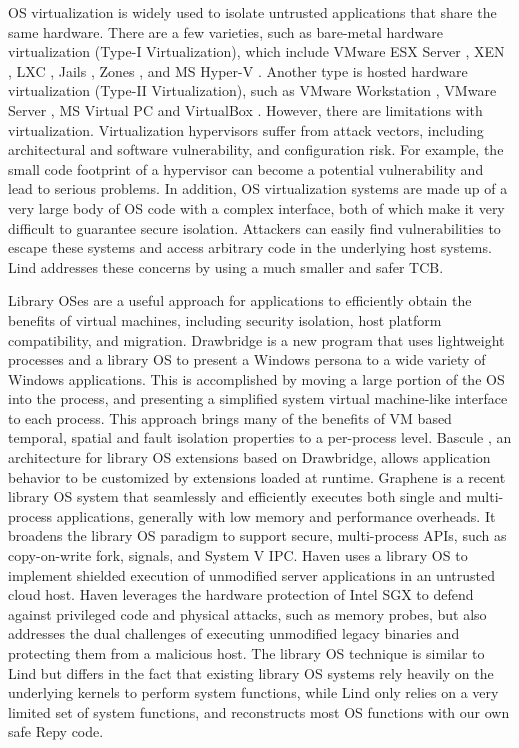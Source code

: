 OS virtualization is widely used to isolate untrusted applications that share the same hardware. 
There are a few varieties, such as bare-metal hardware virtualization (Type-I Virtualization), 
which include VMware ESX Server \cite{VMWare-ESX-Server}, XEN \cite{Xen-03}, LXC \cite{LXC}, 
Jails \cite{Jails}, Zones \cite{Zones}, and MS Hyper-V \cite{Microsoft-Hyper-V}. 
Another type is hosted hardware virtualization (Type-II Virtualization), such as VMware Workstation \cite{VMWare-Workstation}, 
VMware Server \cite{VMWare-Server}, MS Virtual PC \cite{Microsoft-Virtual-PC} and VirtualBox \cite{VirtualBox}. 
However, there are limitations with virtualization. 
Virtualization hypervisors suffer from attack vectors, including architectural and software vulnerability, 
and configuration risk. For example, the small code footprint of a hypervisor can become a potential vulnerability 
and lead to serious problems. In addition, OS virtualization systems are made up of a very large body of 
OS code with a complex interface, both of which make it very difficult to guarantee secure isolation. 
Attackers can easily find vulnerabilities to escape these systems and access arbitrary code 
in the underlying host systems. Lind addresses these concerns by using a much smaller and safer TCB.

Library OSes are a useful approach for applications to efficiently obtain the benefits of virtual machines, 
including security isolation, host platform compatibility, and migration. Drawbridge \cite{Drawbridge-11} is a new program 
that uses lightweight processes and a library OS to present a Windows persona to a wide variety of Windows applications. 
This is accomplished by moving a large portion of the OS into the process, and presenting a simplified system 
virtual machine-like interface to each process. This approach brings many of the benefits of VM based temporal, 
spatial and fault isolation properties to a per-process level. Bascule \cite{Bascule}, an architecture for library OS extensions 
based on Drawbridge, allows application behavior to be customized by extensions loaded at runtime. 
Graphene \cite{Graphene-14} is a recent library OS system that seamlessly and efficiently executes both single and 
multi-process applications, generally with low memory and performance overheads. 
It broadens the library OS paradigm to support secure, multi-process APIs, such as copy-on-write fork, signals, 
and System V IPC. Haven \cite{Haven} uses a library OS to implement shielded execution of unmodified server applications 
in an untrusted cloud host. Haven leverages the hardware protection of Intel SGX to defend against 
privileged code and physical attacks, such as memory probes, but also addresses the dual challenges of 
executing unmodified legacy binaries and protecting them from a malicious host. 
The library OS technique is similar to Lind but differs in the fact that existing library OS systems rely heavily on 
the underlying kernels to perform system functions, while Lind only relies on a very limited set of system functions, 
and reconstructs most OS functions with our own safe Repy code. 

